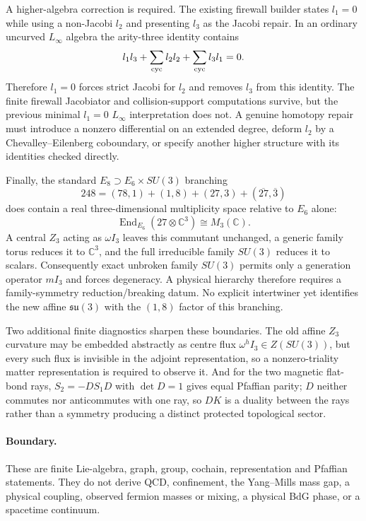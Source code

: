A higher-algebra correction is required.  The existing firewall builder states $l_1=0$ while using a non-Jacobi $l_2$ and presenting $l_3$ as the Jacobi repair.  In an ordinary uncurved $L_\infty$ algebra the arity-three identity contains
\[
l_1l_3+\sum_{\rm cyc}l_2l_2+\sum_{\rm cyc}l_3l_1=0.
\]
Therefore $l_1=0$ forces strict Jacobi for $l_2$ and removes $l_3$ from this identity.  The finite firewall Jacobiator and collision-support computations survive, but the previous minimal $l_1=0$ $L_\infty$ interpretation does not.  A genuine homotopy repair must introduce a nonzero differential on an extended degree, deform $l_2$ by a Chevalley--Eilenberg coboundary, or specify another higher structure with its identities checked directly.

Finally, the standard $E_8\supset E_6\times SU(3)$ branching
\[
248=(78,1)+(1,8)+(27,3)+(\overline{27},\overline3)
\]
does contain a real three-dimensional multiplicity space relative to $E_6$ alone:
\[
\operatorname{End}_{E_6}(27\otimes\mathbb C^3)\cong M_3(\mathbb C).
\]
A central $Z_3$ acting as $\omega I_3$ leaves this commutant unchanged, a generic family torus reduces it to $\mathbb C^3$, and the full irreducible family $SU(3)$ reduces it to scalars.  Consequently exact unbroken family $SU(3)$ permits only a generation operator $mI_3$ and forces degeneracy.  A physical hierarchy therefore requires a family-symmetry reduction/breaking datum.  No explicit intertwiner yet identifies the new affine $\mathfrak{su}(3)$ with the $(1,8)$ factor of this branching.

Two additional finite diagnostics sharpen these boundaries.  The old affine $Z_3$ curvature may be embedded abstractly as centre flux $\omega^hI_3\in Z(SU(3))$, but every such flux is invisible in the adjoint representation, so a nonzero-triality matter representation is required to observe it.  And for the two magnetic flat-bond rays, $S_2=-DS_1D$ with $\det D=1$ gives equal Pfaffian parity; $D$ neither commutes nor anticommutes with one ray, so $DK$ is a duality between the rays rather than a symmetry producing a distinct protected topological sector.

\paragraph{Boundary.}
These are finite Lie-algebra, graph, group, cochain, representation and Pfaffian statements.  They do not derive QCD, confinement, the Yang--Mills mass gap, a physical coupling, observed fermion masses or mixing, a physical BdG phase, or a spacetime continuum.
